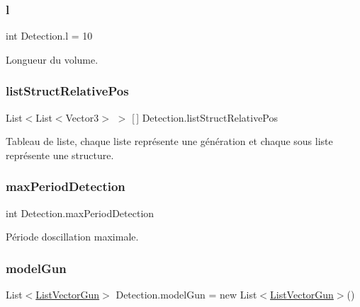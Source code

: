 \subsubsection{\texorpdfstring{l}{l}}
{\footnotesize\ttfamily int Detection.\+l = 10\hspace{0.3cm}{\ttfamily [private]}}



Longueur du volume. 

\mbox{\label{class_detection_a8fb631a5ff0dfc9604e0efb5662b98ad}} 
\subsubsection{\texorpdfstring{list\+Struct\+Relative\+Pos}{listStructRelativePos}}
{\footnotesize\ttfamily List$<$List$<$Vector3$>$ $>$ \mbox{[}$\,$\mbox{]} Detection.\+list\+Struct\+Relative\+Pos\hspace{0.3cm}{\ttfamily [private]}}



Tableau de liste, chaque liste représente une génération et chaque sous liste représente une structure. 

\mbox{\label{class_detection_a98167fc0f3e26398cfd51f95b6a64e72}} 
\subsubsection{\texorpdfstring{max\+Period\+Detection}{maxPeriodDetection}}
{\footnotesize\ttfamily int Detection.\+max\+Period\+Detection\hspace{0.3cm}{\ttfamily [private]}}



Période d\textquotesingle{}oscillation maximale. 

\mbox{\label{class_detection_ae14cf1144858a30db9892e36723e9795}} 
\subsubsection{\texorpdfstring{model\+Gun}{modelGun}}
{\footnotesize\ttfamily List$<$\mbox{\hyperlink{class_list_vector_gun}{List\+Vector\+Gun}}$>$ Detection.\+model\+Gun = new List$<$\mbox{\hyperlink{class_list_vector_gun}{List\+Vector\+Gun}}$>$()\hspace{0.3cm}{\ttfamily [private]}}

